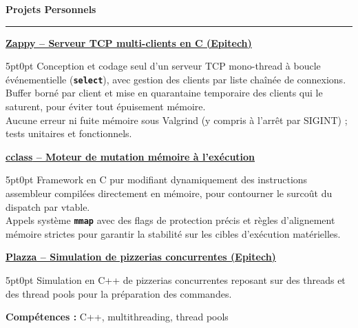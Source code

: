 \documentclass[9pt]{extarticle}
\begin{document}
\par\vspace{5pt}

{\large\bfseries Projets Personnels}
\par\vspace{-8pt}
\rule{\linewidth}{0.4pt}
\par\vspace{5pt}

\underline{\bfseries Zappy -- Serveur TCP multi-clients en C (Epitech)}
\par
\begin{adjustwidth}{5pt}{0pt}
    Conception et codage seul d'un serveur TCP mono-thread à boucle événementielle ({\bfseries \texttt{select}}), avec gestion des clients par liste chaînée de connexions. \\
    Buffer borné par client et mise en quarantaine temporaire des clients qui le saturent, pour éviter tout épuisement mémoire. \\
    Aucune erreur ni fuite mémoire sous Valgrind (y compris à l'arrêt par SIGINT) ; tests unitaires et fonctionnels.
\end{adjustwidth}

\par\vspace{8pt}

\underline{\bfseries \href{https://github.com/paulogarithm/cclass}{cclass} -- Moteur de mutation mémoire à l'exécution}
\par
\begin{adjustwidth}{5pt}{0pt}
    Framework en C pur modifiant dynamiquement des instructions assembleur compilées directement en mémoire, pour contourner le surcoût du dispatch par vtable. \\
    Appels système {\bfseries \texttt{mmap}} avec des flags de protection précis et règles d'alignement mémoire strictes pour garantir la stabilité sur les cibles d'exécution matérielles.
\end{adjustwidth}

\par\vspace{8pt}

\underline{\bfseries Plazza -- Simulation de pizzerias concurrentes (Epitech)}
\par
\begin{adjustwidth}{5pt}{0pt}
    Simulation en C++ de pizzerias concurrentes reposant sur des threads et des thread pools pour la préparation des commandes.
\end{adjustwidth}
\par
{\bfseries Compétences :} C++, multithreading, thread pools
\end{document}
